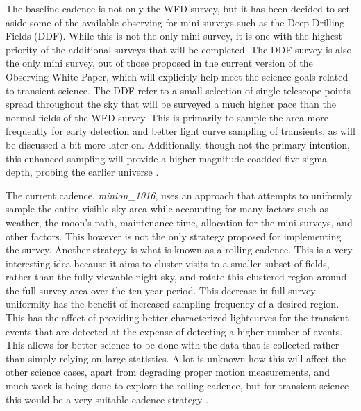 \documentclass[12pt]{article}
\begin{document}
The baseline cadence is not only the WFD survey, but it has been decided to set aside some of the available observing for mini-surveys such as the Deep Drilling Fields (DDF). While this is not the only mini survey, it is one with the highest priority of the additional surveys that will be completed. The DDF survey is also the only mini survey, out of those proposed in the current version of the Observing White Paper, which will explicitly help meet the science goals related to transient science. The DDF refer to a small selection of single telescope points spread throughout the sky that will be surveyed a much higher pace than the normal fields of the WFD survey. This is primarily to sample the area more frequently for early detection and better light curve sampling of transients, as will be discussed a bit more later on. Additionally, though not the primary intention, this enhanced sampling will provide a higher magnitude coadded five-sigma depth, probing the earlier universe \citep{LSSTScienceCollaboration2017}. \par
The current cadence, \textit{minion\_1016}, uses an approach that attempts to uniformly sample the entire visible sky area while accounting for many factors such as weather, the moon's path, maintenance time, allocation for the mini-surveys, and other factors. This however is not the only strategy proposed for implementing the survey. Another strategy is what is known as a rolling cadence. This is a very interesting idea because it aims to cluster visits to a smaller subset of fields, rather than the fully viewable night sky, and rotate this clustered region around the full survey area over the ten-year period. This decrease in full-survey uniformity has the benefit of increased sampling frequency of a desired region. This has the affect of providing better characterized lightcurves for the transient events that are detected at the expense of detecting a higher number of events. This allows for better science to be done with the data that is collected rather than simply relying on large statistics. A lot is unknown how this will affect the other science cases, apart from degrading proper motion measurements, and much work is being done to explore the rolling cadence, but for transient science this would be a very suitable cadence strategy \citep{LSSTScienceCollaboration2017}. \par
\end{document}
